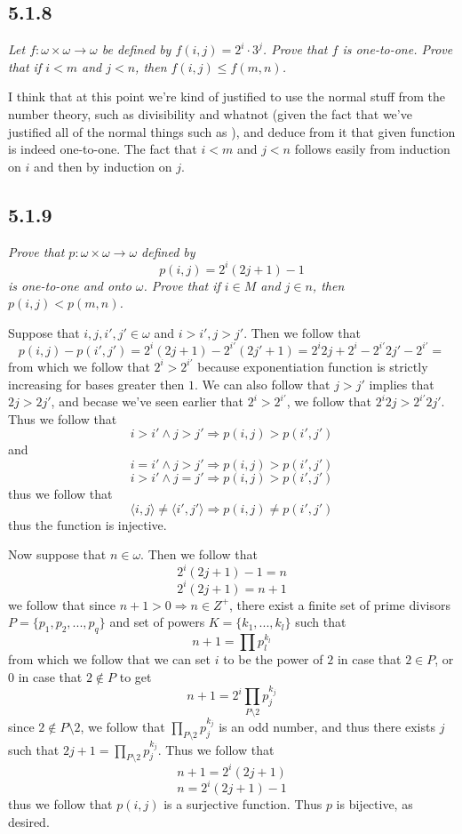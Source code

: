 \documentclass[11pt,oneside,titlepage]{book}
\DeclareMathOperator \ra {\Rightarrow}
\newcommand{\eangle}[1]{\langle #1 \rangle}
\begin{document}
\subsection*{5.1.8}

\textit{Let $f: \omega \times \omega \to \omega$ be defined by $f(i, j) = 2^i \cdot 3^j$.
  Prove that $f$ is one-to-one. Prove that if $i < m$ and $j < n$, then $f(i, j) \leq f(m, n)$.}

I think that at this point we're kind of justified to use the normal stuff from the number
theory, such as divisibility and whatnot (given the fact that we've justified all of the
normal things such as ), and deduce from it that given function is indeed
one-to-one. The fact that $i < m$ and $j < n$ follows easily from induction on $i$ and then
by induction on $j$.

\subsection*{5.1.9}

\textit{Prove that $p: \omega \times \omega \to \omega$ defined by
  $$p(i, j) = 2^i(2j + 1) - 1$$
  is one-to-one and onto $\omega$. Prove that if $i \in M$ and $j \in n$,
  then $p(i, j) < p(m, n)$.}

Suppose that $i, j, i', j' \in \omega$ and $i > i', j > j'$. Then we follow that
$$p(i, j) - p(i', j') = 2^i(2j + 1) - 2^{i'}(2j' + 1) =
2^i 2j + 2^i - 2^{i'} 2j' - 2^{i'} = $$
from which we follow that $2^i > 2^{i'}$ because exponentiation function is strictly increasing
for bases greater then $1$.
We can also follow that $j > j'$ implies that $2j > 2j'$, and becase we've seen earlier that
$2^i > 2^{i'}$, we follow that $2^i 2j  > 2^{i'} 2j'$. Thus we follow that
$$i > i' \land j > j' \ra p(i, j) > p(i', j')$$
and
$$i = i' \land j > j' \ra p(i, j) > p(i', j')$$
$$i > i' \land j = j' \ra p(i, j) > p(i', j')$$
thus we follow that
$$\eangle{i, j} \neq \eangle{i', j'} \ra p(i, j) \neq p(i', j')$$
thus the function is injective.

Now suppose that $n \in \omega$. Then we follow that
$$2^i(2j + 1) - 1 = n$$
$$2^i(2j + 1)  = n + 1$$
we follow that since $n  + 1 > 0 \ra n \in Z^+$,
there exist a finite set of prime divisors $P = \{p_1, p_2, ..., p_q\}$ and set of powers
$K = \{k_1, ..., k_l\}$ such that
$$n + 1 = \prod{p_l^{k_l}}$$
from which we follow that we can set $i$ to be the power of $2$ in case that $2 \in P$, or
$0$ in case that $2 \notin P$ to get 
$$n + 1 = 2^i\prod_{P \setminus 2}{p_j^{k_j}}$$
since $2 \notin P \setminus 2$, we follow that $\prod_{P \setminus 2}{p_j^{k_j}}$ is an odd
number, and thus there exists $j$ such that $2j + 1 = \prod_{P \setminus 2}{p_j^{k_j}}$. Thus
we follow that
$$n + 1 = 2^i(2j + 1)$$
$$n = 2^i(2j + 1) - 1$$
thus we follow that $p(i, j)$ is a surjective function. Thus $p$ is bijective, as desired.
\end{document}
